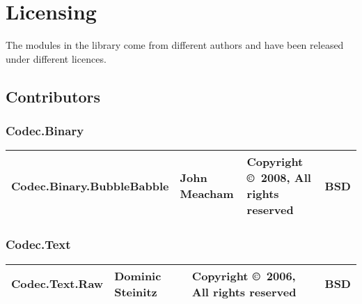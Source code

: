 \documentclass{article}
\begin{document}
\section{Licensing}

The modules in the library come from different authors and have been 
released under different licences. 

\subsection{Contributors}

\subsubsection{Codec.Binary}
\begin{tabular}{|p{6cm}|p{3cm}|p{3cm}|p{1cm}|}
\hline\hline
Codec.Binary.BubbleBabble & John Meacham &
Copyright \copyright\ 2008, All rights reserved & BSD \\
\hline\hline
\end{tabular}

\subsubsection{Codec.Text}
\begin{tabular}{|p{6cm}|p{3cm}|p{3cm}|p{1cm}|}
\hline\hline
Codec.Text.Raw & Dominic Steinitz & 
Copyright \copyright\ 2006, All rights reserved & BSD \\
\hline\hline
\end{tabular}
\end{document}
